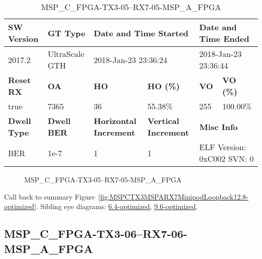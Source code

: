 \begin{table}[h]
\centering
\caption{MSP\_C\_FPGA-TX3-05--RX7-05-MSP\_A\_FPGA}
\label{tab:MSPCFPGATX305RX705MSPAFPGA12.8-optimized}
\begin{tabular}{@{}|l|l|l|l|l|l|@{}}
\toprule
\textbf{SW Version}                & \textbf{GT Type}   & \multicolumn{2}{l|}{\textbf{Date and Time Started}}            & \multicolumn{2}{l|}{\textbf{Date and Time Ended}}        \\ \midrule
2017.2                       & UltraScale GTH          & \multicolumn{2}{l|}{2018-Jan-23 23:36:24}                   & \multicolumn{2}{l|}{2018-Jan-23 23:36:44}               \\ \midrule
\textbf{Reset RX}                  & \textbf{OA} & \textbf{HO}   & \textbf{HO (\%)} & \textbf{VO} & \textbf{VO (\%)} \\ \midrule
true & 7365        & 36          & 55.38\%        & 255        & 100.00\%       \\ \midrule
\textbf{Dwell Type}                & \textbf{Dwell BER} & \textbf{Horizontal Increment} & \textbf{Vertical Increment}    & \multicolumn{2}{l|}{\textbf{Misc Info}}                  \\ \midrule
BER                            & 1e-7        & 1        & 1           & \multicolumn{2}{l|}{ELF Version: 0xC002 SVN: 0}                         \\ \bottomrule
\end{tabular}
\end{table}

\begin{figure}[h]
\caption{MSP\_C\_FPGA-TX3-05--RX7-05-MSP\_A\_FPGA} \label{fig:MSPCFPGATX305RX705MSPAFPGA12.8-optimized}
\end{figure}

Call back to summary Figure~\ref{fig:MSPCTX3MSPARX7MinipodLoopback12.8-optimized}.
Sibling eye diagrams: \hyperref[sec:MSPCFPGATX305RX705MSPAFPGA6.4-optimized]{6.4-optimized}, \hyperref[sec:MSPCFPGATX305RX705MSPAFPGA9.6-optimized]{9.6-optimized}.

\clearpage
\newpage


\subsection{MSP\_C\_FPGA-TX3-06--RX7-06-MSP\_A\_FPGA}\label{sec:MSPCFPGATX306RX706MSPAFPGA12.8-optimized}

